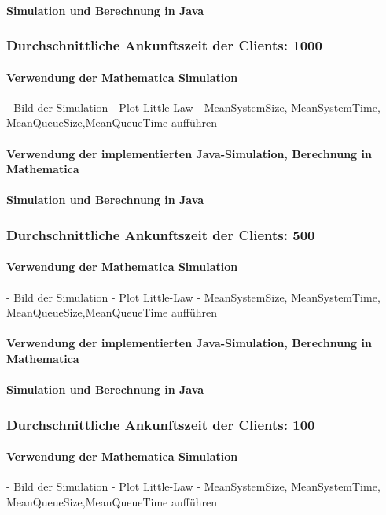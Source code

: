 \paragraph{Simulation und Berechnung in Java}
\subsubsection{Durchschnittliche Ankunftszeit der Clients: 1000}
\paragraph{Verwendung der Mathematica Simulation}
- Bild der Simulation 
- Plot Little-Law
- MeanSystemSize, MeanSystemTime, MeanQueueSize,MeanQueueTime aufführen
\paragraph{Verwendung der implementierten Java-Simulation, Berechnung in Mathematica}
\paragraph{Simulation und Berechnung in Java}
\subsubsection{Durchschnittliche Ankunftszeit der Clients: 500}
\paragraph{Verwendung der Mathematica Simulation}
- Bild der Simulation 
- Plot Little-Law
- MeanSystemSize, MeanSystemTime, MeanQueueSize,MeanQueueTime aufführen
\paragraph{Verwendung der implementierten Java-Simulation, Berechnung in Mathematica}
\paragraph{Simulation und Berechnung in Java}
\subsubsection{Durchschnittliche Ankunftszeit der Clients: 100}
\paragraph{Verwendung der Mathematica Simulation}
- Bild der Simulation 
- Plot Little-Law
- MeanSystemSize, MeanSystemTime, MeanQueueSize,MeanQueueTime aufführen
